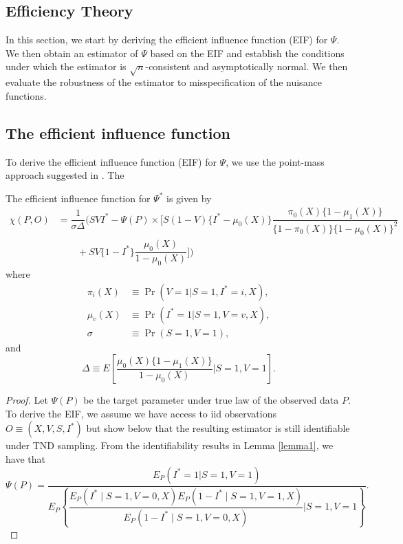\begin{appendix}
    \section{Efficiency Theory}\label{sec:eif}
    In this section, we start by deriving the efficient influence function (EIF) for $\Psi$. We then obtain an estimator of $\Psi$ based on the EIF and establish the conditions under which the estimator is $\sqrt{n}$-consistent and asymptotically normal. We then evaluate the robustness of the estimator to misspecification of the nuisance functions. 
    
    \subsection{The efficient influence function}
    To derive the efficient influence function (EIF) for $\Psi$, we use the point-mass approach suggested in \textcite{hines_demystifying_2022}. The 
    \begin{lemma}
        The efficient influence function for $\Psi^*$ is given by 
        \begin{align*}
         \chi(P, O) &= \dfrac{1}{\sigma \Delta} \Bigg(S V I^* - \Psi(P)  \times \bigg[S(1 - V)\{I^* - \mu_0(X)\}\dfrac{\pi_0(X)\{1 - \mu_1(X)\}}{\{1 - \pi_0(X)\}\{1 - \mu_0(X)\}^2}\\
        &\qquad + S V\{1-I^*\}\dfrac{\mu_0(X)}{1 - \mu_0(X)}\bigg] \Bigg)
    \end{align*}
    where 
    \begin{align*}
        \pi_i(X) &\equiv \Pr(V = 1 | S = 1, I^* = i, X), \\
        \mu_v(X) &\equiv \Pr(I^* = 1 | S = 1, V = v, X), \\
        \sigma &\equiv \Pr(S = 1, V = 1),
    \end{align*}
    and 
    \begin{equation*}
        \Delta \equiv E\left[\dfrac{\mu_0(X)\{1 - \mu_1(X)\}}{1 - \mu_0(X)} \bigg| S=1, V=1\right].
    \end{equation*}
    \end{lemma}

    \begin{proof}
    Let $\Psi(P)$ be the target parameter under true law of the observed data $P$. To derive the EIF, we assume we have access to iid observations $O \equiv (X, V, S, I^*)$ but show below that the resulting estimator is still identifiable under TND sampling. From the identifiability results in Lemma \ref{lemma1}, we have that 
    $$\Psi(P) = \dfrac{E_P(I^* = 1 | S = 1, V = 1)}{E_P\left\{\dfrac{E_P(I^*\mid S=1, V=0, X)E_P(1 - I^*\mid S=1, V=1, X)}{E_P(1 - I^*\mid S=1, V=0, X)} \bigg| S=1, V=1\right\}}.$$ 
    

\end{proof}
\end{appendix}
